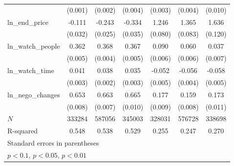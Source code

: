 {\begin{tabular}{l*{6}{c}}
            &     (0.001)         &     (0.002)         &     (0.004)         &     (0.003)         &     (0.004)         &     (0.010)         \\
\addlinespace
ln\_end\_price&      -0.111\sym{***}&      -0.243\sym{***}&      -0.334\sym{***}&       1.246\sym{***}&       1.365\sym{***}&       1.636\sym{***}\\
            &     (0.032)         &     (0.025)         &     (0.035)         &     (0.080)         &     (0.083)         &     (0.120)         \\
\addlinespace
ln\_watch\_people&       0.362\sym{***}&       0.368\sym{***}&       0.367\sym{***}&       0.090\sym{***}&       0.060\sym{***}&       0.037\sym{***}\\
            &     (0.005)         &     (0.004)         &     (0.005)         &     (0.006)         &     (0.006)         &     (0.007)         \\
\addlinespace
ln\_watch\_time&       0.041\sym{***}&       0.038\sym{***}&       0.035\sym{***}&      -0.052\sym{***}&      -0.056\sym{***}&      -0.058\sym{***}\\
            &     (0.003)         &     (0.002)         &     (0.003)         &     (0.005)         &     (0.004)         &     (0.005)         \\
\addlinespace
ln\_nego\_changes&       0.653\sym{***}&       0.663\sym{***}&       0.665\sym{***}&       0.177\sym{***}&       0.159\sym{***}&       0.173\sym{***}\\
            &     (0.008)         &     (0.007)         &     (0.010)         &     (0.009)         &     (0.008)         &     (0.011)         \\
\midrule
\(N\)       &      333284         &      587056         &      345003         &      328031         &      576728         &      338698         \\
R-squared   &       0.548         &       0.538         &       0.529         &       0.255         &       0.247         &       0.270         \\
\bottomrule
\multicolumn{7}{l}{\footnotesize Standard errors in parentheses}\\
\multicolumn{7}{l}{\footnotesize \sym{*} \(p<0.1\), \sym{**} \(p<0.05\), \sym{***} \(p<0.01\)}\\
\end{tabular}
}

